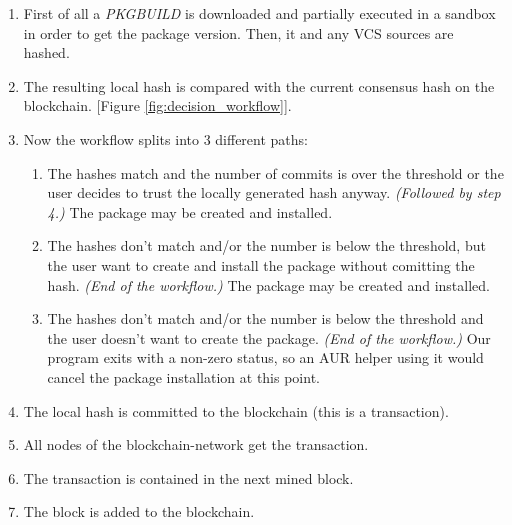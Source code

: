 \begin{enumerate}
	\item First of all a \textit{PKGBUILD} is downloaded and partially executed in a sandbox in order to get the package version. Then, it and any VCS sources are hashed.
	\item The resulting local hash is compared with the current consensus hash on the blockchain. [Figure \ref{fig:decision_workflow}].
	\item Now the workflow splits into 3 different paths:
	\begin{enumerate}
		\item The hashes match and the number of commits is over the threshold or the user decides to trust the locally generated hash anyway. \textit{(Followed by step 4.)} The package may be created and installed.
		\item The hashes don't match and/or the number is below the threshold, but the user want to create and install the package without comitting the hash. \textit{(End of the workflow.)}
		The package may be created and installed.
		\item The hashes don't match and/or the number is below the threshold and the user doesn't want to create the package. \textit{(End of the workflow.)} Our program exits with a non-zero status, so an AUR helper using it would cancel the package installation at this point.
	\end{enumerate}
	\item The local hash is committed to the blockchain (this is a transaction).
	\item All nodes of the blockchain-network get the transaction.
	\item The transaction is contained in the next mined block.
	\item The block is added to the blockchain.
\end{enumerate}
